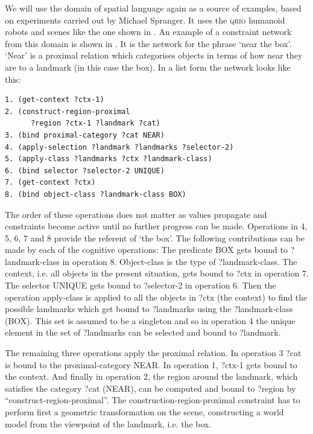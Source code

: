 We will use the domain of spatial language again as a source of examples, based on experiments carried out by 
Michael Spranger. It uses the \textsc{qrio} humanoid robots 
and scenes like the one shown in . An example of a constraint network from this domain 
is shown in . It is the network for the phrase `near the box'. `Near' is a proximal 
relation which categorises objects in terms of how near they are to a landmark (in this case the box). In a list form the 
network looks like this: 
\begin{verbatim}
1. (get-context ?ctx-1) 
2. (construct-region-proximal 
      ?region ?ctx-1 ?landmark ?cat) 
3. (bind proximal-category ?cat NEAR) 
4. (apply-selection ?landmark ?landmarks ?selector-2)
5. (apply-class ?landmarks ?ctx ?landmark-class) 
6. (bind selector ?selector-2 UNIQUE) 
7. (get-context ?ctx) 
8. (bind object-class ?landmark-class BOX)
\end{verbatim}
The order of these operations does not matter as values propagate and constraints become active until no further progress
can be made. Operations in 4, 5, 6, 7 and 8 provide the referent of `the box'. The following contributions 
can be made by each of the cognitive operations: The predicate BOX gets bound to ?landmark-class in operation 8. Object-class is 
the type of ?landmark-class. The context, i.e. all objects in the present situation, gets bound to ?ctx in operation 7. 
The selector UNIQUE gets bound to ?selector-2 in operation 6. 
Then the operation apply-class is applied to all the objects in ?ctx (the context) to find the possible landmarks which 
get bound to ?landmarks using the ?landmark-class (BOX). This set is assumed to be a singleton and so 
in operation 4 the unique element in the set of ?landmarks can be selected 
and bound to ?landmark. 

The remaining three operations apply the proximal relation. In operation 3 ?cat is bound to the proximal-category NEAR. 
In operation 1, ?ctx-1 gets bound to 
the context. And finally in operation 2, the region around the landmark, which satisfies the category ?cat (NEAR), can 
be computed and bound to ?region by ``construct-region-proximal''. The construction-region-proximal constraint has to perform first 
a geometric transformation on the scene, constructing a world model from the viewpoint of the landmark, i.e. the box. 


